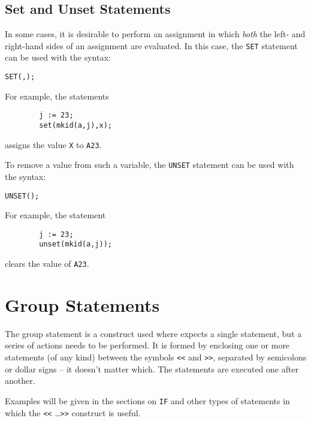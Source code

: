 \subsection{Set and Unset Statements}
\hypertarget{command:SET}{}
\hypertarget{command:UNSET}{}

In some cases, it is desirable to perform an assignment in which \emph{both}
the left- and right-hand sides of an assignment are
evaluated.  In this case, the \texttt{SET} statement can
be used with the syntax:
\begin{syntax}
        \texttt{SET(}\texttt{,}\texttt{);}
\end{syntax}
For example, the statements
\begin{verbatim}
        j := 23;
        set(mkid(a,j),x);
\end{verbatim}
assigns the value \texttt{X} to \texttt{A23}.

To remove a value from such a variable, the \texttt{UNSET}
statement can be used with the syntax:
\begin{syntax}
        \texttt{UNSET(}\texttt{);}
\end{syntax}
For example, the statement
\begin{verbatim}
        j := 23;
        unset(mkid(a,j));
\end{verbatim}
clears the value of \texttt{A23}.

\section{Group Statements}

The group statement
 is a construct used where
{\REDUCE} expects a single statement, but a series of actions needs to be
performed.  It is formed by enclosing one or more statements (of any kind)
between the symbols \texttt{<}\texttt{<} and \texttt{>}\texttt{>}, 
separated by semicolons or
dollar signs -- it doesn't matter which.  The statements are executed one
after another.

Examples will be given in the sections on \texttt{IF} and other
types of statements in which the \texttt{<}\texttt{<} \ldots \texttt{>}\texttt{>} 
construct is useful.

